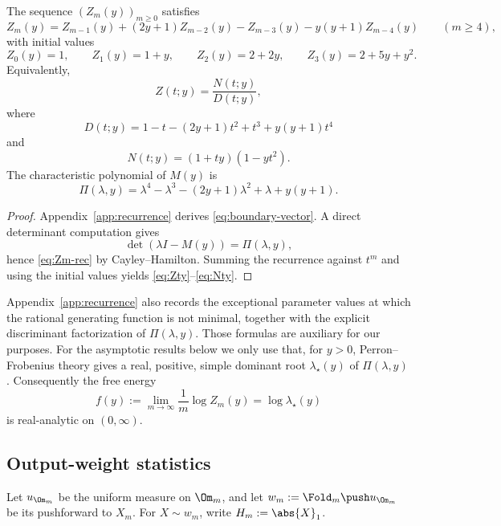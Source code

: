 \begin{proposition}\label{prop:recurrence}
The sequence \((Z_m(y))_{m\ge 0}\) satisfies
\begin{equation}\label{eq:Zm-rec}
Z_m(y)=Z_{m-1}(y)+(2y+1)Z_{m-2}(y)-Z_{m-3}(y)-y(y+1)Z_{m-4}(y)
\qquad (m\ge 4),
\end{equation}
with initial values
\[
Z_0(y)=1,\qquad
Z_1(y)=1+y,\qquad
Z_2(y)=2+2y,\qquad
Z_3(y)=2+5y+y^2.
\]
Equivalently,
\begin{equation}\label{eq:Zty}
Z(t;y)=\frac{N(t;y)}{D(t;y)},
\end{equation}
where
\begin{equation}\label{eq:Dty}
D(t;y)=1-t-(2y+1)t^2+t^3+y(y+1)t^4
\end{equation}
and
\begin{equation}\label{eq:Nty}
N(t;y)=(1+ty)(1-yt^2).
\end{equation}
The characteristic polynomial of \(M(y)\) is
\begin{equation}\label{eq:Pi}
\Pi(\lambda,y)=\lambda^4-\lambda^3-(2y+1)\lambda^2+\lambda+y(y+1).
\end{equation}
\end{proposition}

\begin{proof}
Appendix~\ref{app:recurrence} derives \eqref{eq:boundary-vector}. A direct determinant computation gives
\[
\det(\lambda I-M(y))=\Pi(\lambda,y),
\]
hence \eqref{eq:Zm-rec} by Cayley--Hamilton. Summing the recurrence against \(t^m\) and using the initial values yields \eqref{eq:Zty}--\eqref{eq:Nty}.
\end{proof}

Appendix~\ref{app:recurrence} also records the exceptional parameter values at which the rational generating function is not minimal, together with the explicit discriminant factorization of \(\Pi(\lambda,y)\). Those formulas are auxiliary for our purposes. For the asymptotic results below we only use that, for \(y>0\), Perron--Frobenius theory gives a real, positive, simple dominant root \(\lambda_\star(y)\) of \(\Pi(\lambda,y)\). Consequently the free energy
\[
f(y):=\lim_{m\to\infty}\frac1m\log Z_m(y)=\log \lambda_\star(y)
\]
is real-analytic on \((0,\infty)\).

\subsection{Output-weight statistics}
\label{subsec:weight-stats}

Let \(u_{\Om_m}\) be the uniform measure on \(\Om_m\), and let \(w_m:=\Fold_m\push u_{\Om_m}\) be its pushforward to \(X_m\). For \(X\sim w_m\), write \(H_m:=\abs{X}_1\).

